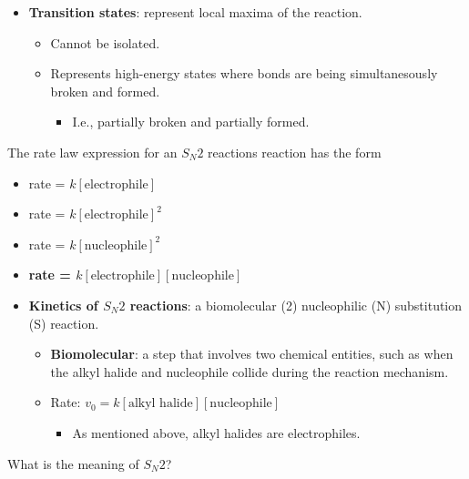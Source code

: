 \documentclass[12pt,a4paper]{article}
\begin{document}
\begin{enumerate}
{\begin{itemize}
    \end{itemize}
    }
    \begin{itemize}
        \item \textbf{Transition states}: represent local maxima of the reaction.
        \begin{itemize}
            \item Cannot be isolated.
            \item Represents high-energy states where bonds are being simultanesously broken and formed.
                \begin{itemize}
                    \item I.e., partially broken and partially formed.
                \end{itemize}
        \end{itemize}
    \end{itemize}
    {\color{G-Moon}\item The rate law expression for an \(S_N2\) reactions reaction has the form
    \begin{itemize}
        \item rate = \(k[\text{electrophile}]\)
        \item rate = \(k[\text{electrophile}]^2\)
        \item rate = \(k[\text{nucleophile}]^2\)
        \item {\color{o-Sun}\textbf{rate = \(k[\text{electrophile}][\text{nucleophile}]\)}}
    \end{itemize}
    }
    \begin{itemize}
        \item \textbf{Kinetics of \(S_N2\) reactions}: a biomolecular (2) nucleophilic (N) substitution (S) reaction. 
        \begin{itemize}
            \item \textbf{Biomolecular}: a step that involves two chemical entities, such as when the alkyl halide and nucleophile collide during the reaction mechanism. 
            \item Rate: \(v_0 = k[\text{alkyl halide}][\text{nucleophile}]\)
                \begin{itemize}
                    \item As mentioned above, alkyl halides are electrophiles.
                \end{itemize}
        \end{itemize}
    \end{itemize}
    \newpage
    {\color{G-Moon}\item What is the meaning of \(S_N2\)?
}
\end{enumerate}
\end{document}

